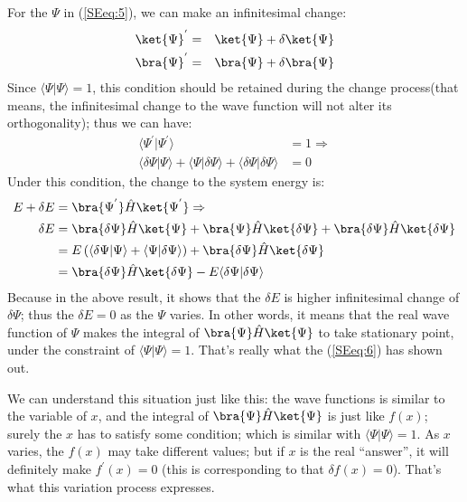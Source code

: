 For the $\Psi$ in (\ref{SEeq:5}), we can make an infinitesimal
change:
\begin{eqnarray}
  \ket{\Psi}^{'} &=& \ket{\Psi} + \delta\ket{\Psi} \nonumber \\
  \bra{\Psi}^{'} &=& \bra{\Psi} + \delta\bra{\Psi}
\end{eqnarray}
Since $\langle\Psi|\Psi\rangle = 1$, this condition should be
retained during the change process(that means, the infinitesimal
change to the wave function will not alter its orthogonality); thus
we can have:
\begin{align}\label{}
\langle\Psi^{'}|\Psi^{'}\rangle &= 1  \Rightarrow \nonumber \\
\langle\delta\Psi|\Psi\rangle + \langle\Psi|\delta\Psi\rangle +
\langle\delta\Psi|\delta\Psi\rangle &= 0
\end{align}
Under this condition, the change to the system energy is:
\begin{align}\label{}
E + \delta E &= \bra{\Psi^{'}}\hat{H}\ket{\Psi^{'}} \Rightarrow \nonumber \\
\delta E &= \bra{\delta\Psi}\hat{H}\ket{\Psi} +
\bra{\Psi}\hat{H}\ket{\delta\Psi} +
\bra{\delta\Psi}\hat{H}\ket{\delta\Psi} \nonumber \\
&= E\left(\langle\delta\Psi|\Psi\rangle +
\langle\Psi|\delta\Psi\rangle\right) +
\bra{\delta\Psi}\hat{H}\ket{\delta\Psi} \nonumber \\
&=\bra{\delta\Psi}\hat{H}\ket{\delta\Psi} -
E\langle\delta\Psi|\delta\Psi\rangle
\end{align}
Because in the above result, it shows that the $\delta E$ is higher
infinitesimal change of $\delta\Psi$; thus the $\delta E = 0$ as the
$\Psi$ varies. In other words, it means that the real wave function
of $\Psi$ makes the integral of $\bra{\Psi}\hat{H}\ket{\Psi}$ to
take stationary point, under the constraint of
$\langle\Psi|\Psi\rangle = 1$. That's really what the (\ref{SEeq:6})
has shown out.

We can understand this situation just like this: the wave functions
is similar to the variable of $x$, and the integral of
$\bra{\Psi}\hat{H}\ket{\Psi}$ is just like $f(x)$; surely the $x$
has to satisfy some condition; which is similar with
$\langle\Psi|\Psi\rangle = 1$. As $x$ varies, the $f(x)$ may take
different values; but if $x$ is the real ``answer'', it will
definitely make $f^{'}(x) = 0$ (this is corresponding to that
$\delta f(x) = 0$). That's what this variation process expresses.

